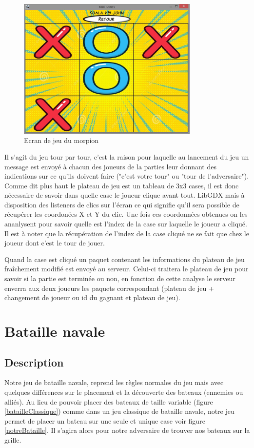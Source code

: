 \documentclass{report}
\begin{document}
\begin{figure}[H]
	\centering\includegraphics[width=9cm]{morpioningame}
	\caption{Ecran de jeu du morpion}
  \label{morpion_en_jeu}
\end{figure}

Il s'agit du jeu tour par tour, c'est la raison pour laquelle au lancement du jeu un message est envoyé à chacun des joueurs de la parties
leur donnant des indications sur ce qu'ils doivent faire ("c'est votre tour" ou "tour de l'adversaire").
Comme dit plus haut le plateau de jeu est un tableau de 3x3 cases, il est donc nécessaire
de savoir dans quelle case le joueur clique avant tout. LibGDX mais à disposition des listeners de clics sur l'écran ce qui signifie qu'il sera possible
de récupérer les coordonées X et Y du clic. Une fois ces coordonnées obtenues on les ananlysent pour savoir quelle est l'index de la case sur laquelle
le joueur a cliqué. Il est à noter que la récupération de l'index de la case cliqué ne se fait que chez le joueur dont c'est le tour de jouer.

Quand la case est cliqué un paquet contenant les informations du plateau de jeu fraîchement modifié est envoyé au serveur. Celui-ci traitera le plateau de jeu
pour savoir si la partie est terminée ou non, en fonction de cette analyse le serveur enverra aux deux joueurs les paquets correspondant (plateau de jeu +
 changement de joueur ou id du gagnant et plateau de jeu).

\section{Bataille navale}
\label{Bataille navale}

\subsection{Description}
Notre jeu de bataille navale, reprend les règles normales du jeu mais avec quelques différences sur le placement et la découverte des bateaux (ennemies ou alliés). Au lieu de pouvoir placer
des bateaux de taille variable (figure \ref{batailleClassique}) comme dans un jeu classique de bataille navale, notre jeu permet de placer un bateau sur une seule et unique case
voir figure \ref{notreBataille}. Il s'agira alors pour notre adversaire de trouver nos bateaux sur la grille.
\end{document}
